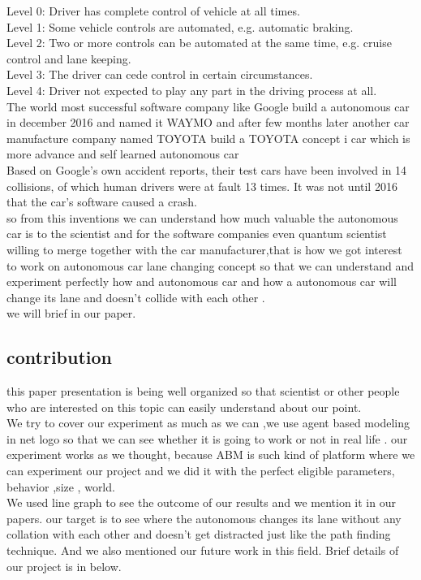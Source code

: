 \documentclass[conference]{IEEEtran}
\begin{document}
Level 0: Driver has complete control of vehicle at all times.\\
Level 1: Some vehicle controls are automated, e.g. automatic braking.\\
Level 2: Two or more controls can be automated at the same time, e.g. cruise control and lane keeping.\\
Level 3: The driver can cede control in certain circumstances.\\
Level 4: Driver not expected to play any part in the driving process at all.\\ 
The world most successful software company like Google build a autonomous car in december 2016 and named it WAYMO and after few months later another car manufacture company named TOYOTA build a TOYOTA concept i car which is more advance and self learned autonomous car\\
Based on Google's own accident reports, their test cars have been involved in 14 collisions, of which human drivers were at fault 13 times. It was not until 2016 that the car's software caused a crash.\\
so from this inventions we can understand how much valuable the autonomous car is to the scientist and for the software companies even quantum scientist willing to merge together with the car manufacturer,that is how we got interest to work on autonomous car lane changing concept so that we can understand and experiment perfectly how and autonomous car and how a autonomous car will change its lane and doesn't collide with each other .\\
we will brief in our paper.  \\  


\subsection{contribution}
this paper presentation is being well organized so that scientist or other people who are interested on this topic can easily understand about our point. \\
We try to cover our experiment as much as we can ,we use agent based modeling in net logo so that we can see whether it is going to work or not in real life . our experiment works as we thought, because ABM is such kind of platform where we can experiment our project and we did it with the perfect eligible parameters, behavior ,size , world.\\
We used line graph to see the outcome of our results and we mention it in our papers. our target is to see where the autonomous changes its lane without any collation with each other and doesn't get distracted just like the path finding technique. And we also mentioned our future work in this field. Brief details of our project is in below.  \\
\end{document}

